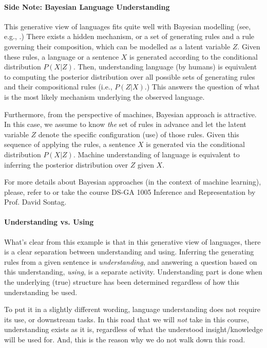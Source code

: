 \documentclass{report}
\begin{document}
\paragraph{Side Note: Bayesian Language Understanding} This generative view of
languages fits quite well with Bayesian modelling (see, e.g.,
\cite{perfors2006poverty}.) There exists a hidden mechanism, or a set of
generating rules and a rule governing their composition, which can be modelled
as a latent variable $Z$.  Given these rules, a language or a sentence $X$ is
generated according to the conditional distribution $P(X|Z)$. Then,
understanding language (by humans) is equivalent to computing the posterior
distribution over all possible sets of generating rules and their compositional
rules (i.e., $P(Z|X)$.) This answers the question of what is the most likely
mechanism underlying the observed language.

Furthermore, from the perspective of machines, Bayesian approach is attractive.
In this case, we assume to know {\it the} set of rules in advance and let the
latent variable $Z$ denote the specific configuration (use) of those rules.
Given this sequence of applying the rules, a sentence $X$ is generated via the
conditional distribution $P(X|Z)$. Machine understanding of language is
equivalent to inferring the posterior distribution over $Z$ given $X$.

For more details about Bayesian approaches (in the context of machine learning),
please, refer to \cite{bishop2006pattern} or take the course DS-GA 1005
Inference and Representation by Prof. David Sontag.

\paragraph{Understanding vs. Using} 
What's clear from this example is that in this generative view of languages,
there is a clear separation between understanding and using. Inferring the
generating rules from a given sentence is {\it understanding}, and answering a
question based on this understanding, {\it using}, is a separate activity.
Understanding part is done when the underlying (true) structure has been
determined regardless of how this understanding be used.

To put it in a slightly different wording, language understanding does not
require its use, or downstream tasks. In this road that we will {\em not} take
in this course, understanding exists as it is, regardless of what the understood
insight/knowledge will be used for. And, this is the reason why we do not walk
down this road.
\end{document}

